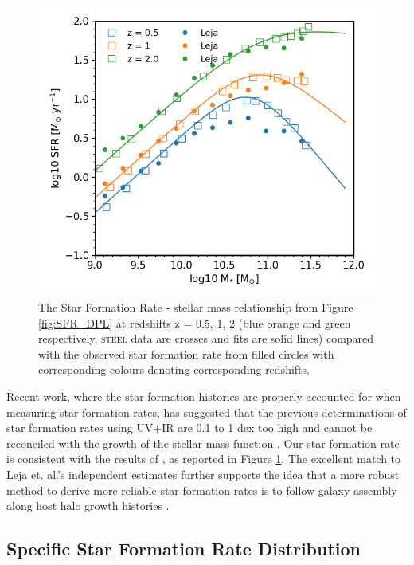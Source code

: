 \begin{figure}[h]
    \centering
    \includegraphics[width = 0.8\linewidth]{Figures/Chapter4/HMC_DPL_wLeja.png}
    \caption{The Star Formation Rate - stellar mass relationship from Figure \ref{fig:SFR_DPL} at redshifts z = 0.5, 1, 2 (blue orange and green respectively, \textsc{steel} data are crosses and fits are solid lines) compared with the observed star formation rate from \citet{Leja2019AnSurvey} filled circles with corresponding colours denoting corresponding redshifts.}
    \label{fig:SFR_L18}
\end{figure}

Recent work, where the star formation histories are properly accounted for when measuring star formation rates, has suggested that the previous determinations of star formation rates using UV+IR are 0.1 to 1 dex too high \citep{Leja2019AnSurvey} and cannot be reconciled with the growth of the stellar mass function \citep{Leja2015ReconcilingFunction, Lapi2017StellarEquation}. Our star formation rate is consistent with the results of \citet{Leja2019AnSurvey}, as reported in Figure \ref{fig:SFR_L18}. The excellent match to Leja et. al.'s independent estimates further supports the idea that a more robust method to derive more reliable star formation rates is to follow galaxy assembly along host halo growth histories \citep[see e.g.,][]{Moster2018Emerge10}. 

\subsection{Specific Star Formation Rate Distribution}
\label{subsec:sSFR}

